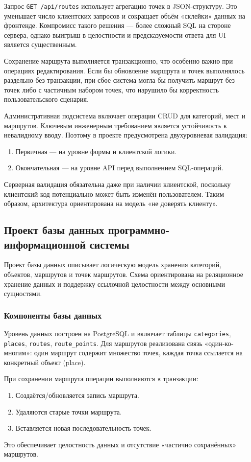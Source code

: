 Запрос \texttt{GET /api/routes} использует агрегацию точек в JSON-структуру.
Это уменьшает число клиентских запросов и сокращает объём «склейки» данных на
фронтенде. Компромисс такого решения --- более сложный SQL на стороне сервера,
однако выигрыш в целостности и предсказуемости ответа для UI является существенным.

Сохранение маршрута выполняется транзакционно, что особенно важно при операциях
редактирования. Если бы обновление маршрута и точек выполнялось раздельно без
транзакции, при сбое система могла бы получить маршрут без точек либо с частичным
набором точек, что нарушило бы корректность пользовательского сценария.

Административная подсистема включает операции CRUD для категорий, мест и маршрутов.
Ключевым инженерным требованием является устойчивость к невалидному вводу.
Поэтому в проекте предусмотрена двухуровневая валидация:
\begin{enumerate}
	\item Первичная --- на уровне формы и клиентской логики.
	\item Окончательная --- на уровне API перед выполнением SQL-операций.
\end{enumerate}

Серверная валидация обязательна даже при наличии клиентской, поскольку клиентский
код потенциально может быть изменён пользователем. Таким образом, архитектура
ориентирована на модель «не доверять клиенту».

\subsection{Проект базы данных программно-информационной системы}
Проект базы данных описывает логическую модель хранения категорий, объектов,
маршрутов и точек маршрутов. Схема ориентирована на реляционное хранение данных
и поддержку ссылочной целостности между основными сущностями.

\subsubsection{Компоненты базы данных}
Уровень данных построен на PostgreSQL и включает таблицы \texttt{categories},
\texttt{places}, \texttt{routes}, \texttt{route\_points}. Для маршрутов реализована связь
«один-ко-многим»: один маршрут содержит множество точек, каждая точка
ссылается на конкретный объект (place).

При сохранении маршрута операции выполняются в транзакции:
\begin{enumerate}
	\item Создаётся/обновляется запись маршрута.
	\item Удаляются старые точки маршрута.
	\item Вставляется новая последовательность точек.
\end{enumerate}
Это обеспечивает целостность данных и отсутствие «частично сохранённых» маршрутов.

